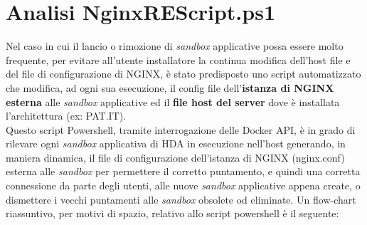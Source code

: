 \section{Analisi NginxREScript.ps1}
Nel caso in cui il lancio o rimozione di \textit{sandbox} applicative possa essere molto frequente, per evitare all'utente installatore la continua modifica dell'host file e del file di configurazione di NGINX, è stato predisposto uno script automatizzato che modifica, ad ogni sua esecuzione, il config file dell'\textbf{istanza di NGINX esterna} alle \textit{sandbox} applicative ed il \textbf{file host del server} dove è installata l'architettura (ex: PAT.IT).\\
Questo script Powershell, tramite interrogazione delle Docker API, è in grado di rilevare ogni \textit{sandbox} applicativa di HDA in esecuzione nell'host generando, in maniera dinamica, il file di configurazione dell'istanza di NGINX (nginx.conf) esterna alle \textit{sandbox} per permettere il corretto puntamento, e quindi una corretta connessione da parte degli utenti, alle nuove \textit{sandbox} applicative appena create, o dismettere i vecchi puntamenti alle \textit{sandbox} obsolete od eliminate. 
Un flow-chart riassuntivo, per motivi di spazio, relativo allo script powershell è il seguente:










